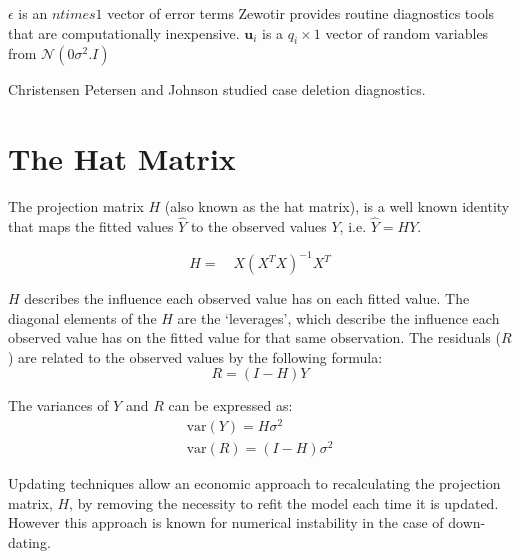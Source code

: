 \documentclass[12pt, a4paper]{article}
\begin{document}
$\epsilon$ is an $n times 1$ vector of error terms
Zewotir provides routine diagnostics tools that are computationally inexpensive.
$\boldsymbol{u}_i$ is a $q_i \times 1$  vector of random variables from $\mathcal{N}(0 \sigma^2.I)$


Christensen Petersen and Johnson studied case deletion diagnostics. 




\section{The Hat Matrix} %

The projection matrix $H$ (also known as the hat matrix), is a
well known identity that maps the fitted values $\hat{Y}$ to the
observed values $Y$, i.e. $\hat{Y} = HY$.

\begin{equation}
H =\quad X(X^{T}X)^{-1}X^{T}
\end{equation}

$H$ describes the influence each observed value has on each fitted
value. The diagonal elements of the $H$ are the `leverages', which
describe the influence each observed value has on the fitted value
for that same observation. The residuals ($R$) are related to the
observed values by the following formula:
\begin{equation}
R = (I-H)Y
\end{equation}

The variances of $Y$ and $R$ can be expressed as:
\begin{eqnarray}
\mbox{var}(Y) = H\sigma^{2} \nonumber\\
\mbox{var}(R) = (I-H)\sigma^{2}
\end{eqnarray}

Updating techniques allow an economic approach to recalculating
the projection matrix, $H$, by removing the necessity to refit the
model each time it is updated. However this approach is known for
numerical instability in the case of down-dating.



\end{document}
